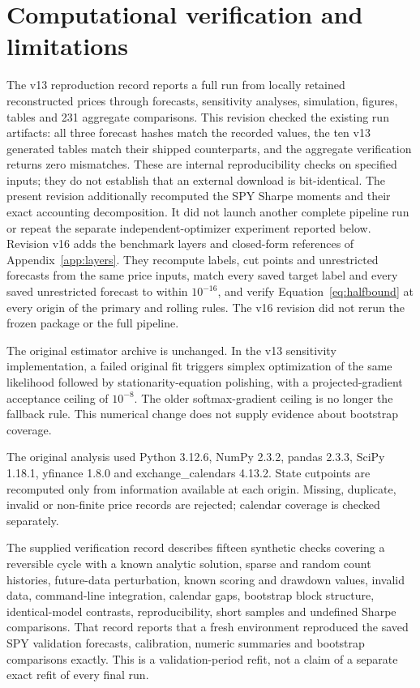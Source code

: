 \section{Computational verification and limitations}
The v13 reproduction record reports a full run from locally retained reconstructed prices through forecasts, sensitivity analyses, simulation, figures, tables and 231 aggregate comparisons. This revision checked the existing run artifacts: all three forecast hashes match the recorded values, the ten v13 generated tables match their shipped counterparts, and the aggregate verification returns zero mismatches. These are internal reproducibility checks on specified inputs; they do not establish that an external download is bit-identical. The present revision additionally recomputed the SPY Sharpe moments and their exact accounting decomposition. It did not launch another complete pipeline run or repeat the separate independent-optimizer experiment reported below. Revision v16 adds the benchmark layers and closed-form references of Appendix~\ref{app:layers}. They recompute labels, cut points and unrestricted forecasts from the same price inputs, match every saved target label and every saved unrestricted forecast to within $10^{-16}$, and verify Equation~\eqref{eq:halfbound} at every origin of the primary and rolling rules. The v16 revision did not rerun the frozen package or the full pipeline.

The original estimator archive is unchanged. In the v13 sensitivity implementation, a failed original fit triggers simplex optimization of the same likelihood followed by stationarity-equation polishing, with a projected-gradient acceptance ceiling of $10^{-8}$. The older softmax-gradient ceiling is no longer the fallback rule. This numerical change does not supply evidence about bootstrap coverage.

The original analysis used Python 3.12.6, NumPy 2.3.2, pandas 2.3.3, SciPy 1.18.1,
yfinance 1.8.0 and exchange\_calendars 4.13.2. State cutpoints are recomputed only
from information available at each origin. Missing, duplicate, invalid or
non-finite price records are rejected; calendar coverage is checked separately.

The supplied verification record describes fifteen synthetic checks covering a reversible cycle with a known analytic solution,
sparse and random count histories, future-data perturbation, known scoring and
drawdown values, invalid data, command-line integration, calendar gaps, bootstrap
block structure, identical-model contrasts, reproducibility, short samples and
undefined Sharpe comparisons. That record reports that a fresh environment reproduced the saved SPY
validation forecasts, calibration, numeric summaries and bootstrap comparisons
exactly. This is a validation-period refit, not a claim of a separate exact refit
of every final run.

